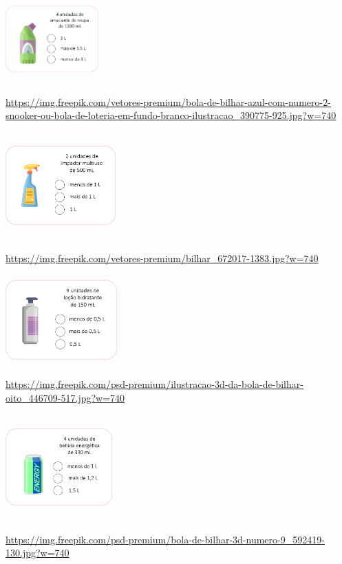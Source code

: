 \includegraphics[width=1.40833in,height=1.33406in]{media/image21.png}

\url{https://img.freepik.com/vetores-premium/bola-de-bilhar-azul-com-numero-2-snooker-ou-bola-de-loteria-em-fundo-branco-ilustracao_390775-925.jpg?w=740}

\includegraphics[width=1.66667in,height=1.61877in]{media/image22.png}

\url{https://img.freepik.com/vetores-premium/bilhar_672017-1383.jpg?w=740}

\includegraphics[width=1.68333in,height=1.36449in]{media/image23.png}

\url{https://img.freepik.com/psd-premium/ilustracao-3d-da-bola-de-bilhar-oito_446709-517.jpg?w=740}

\includegraphics[width=1.61667in,height=1.60236in]{media/image24.png}

\url{https://img.freepik.com/psd-premium/bola-de-bilhar-3d-numero-9_592419-130.jpg?w=740}


